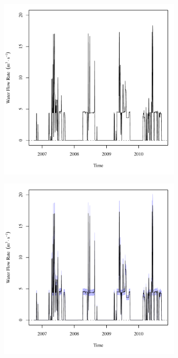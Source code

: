 \begin{linenumbers}
\begin{landscape}
\begin{figure}
\begin{subfigure}{0.7\textwidth}
			\includegraphics[width=\tableCustomSize]{"Figures/Results_USR/Deterministic/Q HOL"}
		\end{subfigure}%
		\begin{subfigure}{0.7\textwidth}
			\centering
			\includegraphics[width=\tableCustomSize]{"Figures/Results_USR/Stochastic/Q HOL"}

\end{subfigure}
\end{figure}
\end{landscape}
\end{linenumbers}
